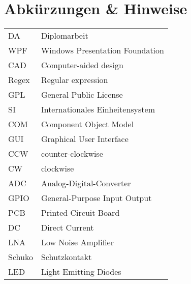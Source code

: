 \section*{Abkürzungen \& Hinweise}
\begin{singlespace}
	\begin{tabular}{ll}
		DA     & Diplomarbeit \\
		WPF    & Windows Presentation Foundation \\
		CAD    & Computer-aided design \\
		Regex  & Regular expression \\
		GPL    & General Public License  \\
		SI     & Internationales Einheitensystem \\
		COM    & Component Object Model \\
		GUI    & Graphical User Interface \\
		CCW	   & counter-clockwise \\
		CW     & clockwise \\
		ADC	   & Analog-Digital-Converter \\
		GPIO   & General-Purpose Input Output \\
		PCB	   & Printed Circuit Board \\
		DC     & Direct Current \\
		LNA    & Low Noise Amplifier \\
		Schuko & Schutzkontakt \\
		LED	   & Light Emitting Diodes \\
	\end{tabular}
\end{singlespace}

\pagebreak
